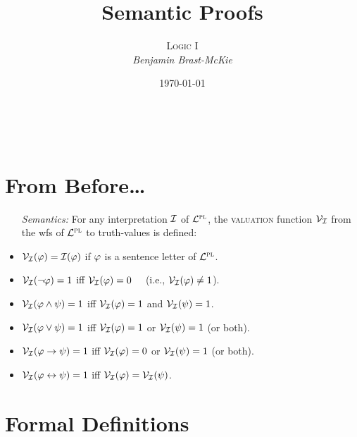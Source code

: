 \documentclass[a4paper, 11pt]{article} %
\title{\textbf{Semantic Proofs}} %
\author{\textsc{Logic I}\\ \em Benjamin Brast-McKie} %
\date{\today} %
\makeatletter
\renewcommand{\maketitle}{
\begin{flushright}
{\LARGE\@title}

\vspace{10pt}

{\@author}
\\ \@date
\end{flushright}

\vspace{-20pt}

}
\makeatother
\begin{document}
\maketitle %

\thispagestyle{empty}


\section*{From Before\ldots}

\begin{itemize}[leftmargin=1in,labelsep=.15in] %
  \item[\it Semantics:] For any interpretation $\mathcal{I}$ of $\mathcal{L}^{\textsc{pl}}$, the \textsc{valuation} function $\mathcal{V}_{\mathcal{I}}$ from the wfs of $\mathcal{L}^{\textsc{pl}}$ to truth-values is defined:
    \item $\mathcal{V}_{\mathcal{I}}(\varphi)=\mathcal{I}(\varphi)$ if $\varphi$ is a sentence letter of $\mathcal{L}^{\textsc{pl}}$.
    \item $\mathcal{V}_{\mathcal{I}}(\neg\varphi)=1$ iff $\mathcal{V}_{\mathcal{I}}(\varphi)=0$~~ (i.e., $\mathcal{V}_{\mathcal{I}}(\varphi)\neq 1$).
    \item $\mathcal{V}_{\mathcal{I}}(\varphi \wedge \psi)=1$ iff $\mathcal{V}_{\mathcal{I}}(\varphi)=1$ and $\mathcal{V}_{\mathcal{I}}(\psi)=1$.
    \item $\mathcal{V}_{\mathcal{I}}(\varphi \vee \psi)=1$ iff $\mathcal{V}_{\mathcal{I}}(\varphi)=1$ or $\mathcal{V}_{\mathcal{I}}(\psi)=1$ (or both).
    \item $\mathcal{V}_{\mathcal{I}}(\varphi \rightarrow \psi)=1$ iff $\mathcal{V}_{\mathcal{I}}(\varphi)=0$ or $\mathcal{V}_{\mathcal{I}}(\psi)=1$ (or both).
    \item $\mathcal{V}_{\mathcal{I}}(\varphi \leftrightarrow \psi)=1$ iff $\mathcal{V}_{\mathcal{I}}(\varphi)=\mathcal{V}_{\mathcal{I}}(\psi)$.
\end{itemize}





\section*{Formal Definitions}
\end{document}
